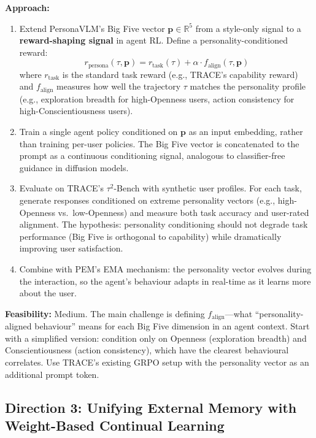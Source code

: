 \documentclass[11pt]{article}
\begin{document}
\textbf{Approach:}
\begin{enumerate}
    \item Extend PersonaVLM's Big Five vector $\mathbf{p} \in \mathbb{R}^5$ from a style-only signal to a \textbf{reward-shaping signal} in agent RL. Define a personality-conditioned reward:
    \begin{equation}
        r_{\mathrm{persona}}(\tau, \mathbf{p}) = r_{\mathrm{task}}(\tau) + \alpha \cdot f_{\mathrm{align}}(\tau, \mathbf{p})
    \end{equation}
    where $r_{\mathrm{task}}$ is the standard task reward (e.g., TRACE's capability reward) and $f_{\mathrm{align}}$ measures how well the trajectory $\tau$ matches the personality profile (e.g., exploration breadth for high-Openness users, action consistency for high-Conscientiousness users).

    \item Train a single agent policy conditioned on $\mathbf{p}$ as an input embedding, rather than training per-user policies. The Big Five vector is concatenated to the prompt as a continuous conditioning signal, analogous to classifier-free guidance in diffusion models.

    \item Evaluate on TRACE's $\tau^2$-Bench with synthetic user profiles. For each task, generate responses conditioned on extreme personality vectors (e.g., high-Openness vs.\ low-Openness) and measure both task accuracy and user-rated alignment. The hypothesis: personality conditioning should not degrade task performance (Big Five is orthogonal to capability) while dramatically improving user satisfaction.

    \item Combine with PEM's EMA mechanism: the personality vector evolves during the interaction, so the agent's behaviour adapts in real-time as it learns more about the user.
\end{enumerate}

\textbf{Feasibility:} Medium. The main challenge is defining $f_{\mathrm{align}}$---what ``personality-aligned behaviour'' means for each Big Five dimension in an agent context. Start with a simplified version: condition only on Openness (exploration breadth) and Conscientiousness (action consistency), which have the clearest behavioural correlates. Use TRACE's existing GRPO setup with the personality vector as an additional prompt token.

\subsection{Direction 3: Unifying External Memory with Weight-Based Continual Learning}
\end{document}
